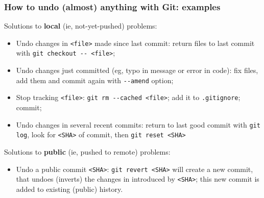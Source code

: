 \documentclass[10pt,svgnames]{beamer}
\begin{document}
\begin{frame}
\frametitle{How to undo (almost) anything with Git: examples}
Solutions to \textbf{local} (ie, not-yet-pushed) problems:
\begin{itemize}[<+->]
  \item Undo changes in \lstinline{<file>} made since last commit: return files to last commit with \lstinline{git checkout -- <file>};
  \item Undo changes just committed (eg, typo in message or error in code): fix files, add them and commit again with \lstinline{--amend} option;
  \item Stop tracking \lstinline{<file>}: \lstinline{git rm --cached <file>}; add it to \lstinline{.gitignore}; commit;
  \item Undo changes in several recent commits: return to last good commit with \lstinline{git log}, look for \lstinline{<SHA>} of commit, then \lstinline{git reset <SHA>}
\end{itemize}
\medskip
\pause
Solutions to \textbf{public} (ie, pushed to remote) problems:
\begin{itemize}
  \item Undo a public commit \lstinline{<SHA>}: \lstinline{git revert <SHA>} will create a new commit, that undoes (inverts) the changes in introduced by \lstinline{<SHA>}; this new commit is added to existing (public) history.
\end{itemize}

\end{frame}
\end{document}

